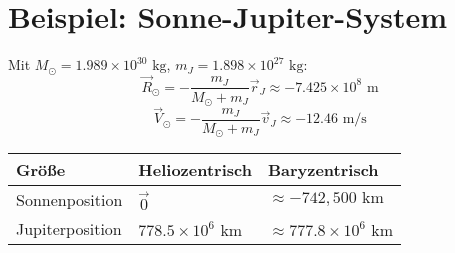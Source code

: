 \section{Beispiel: Sonne-Jupiter-System}
Mit $M_\odot = 1.989 \times 10^{30} \text{ kg}$, $m_J = 1.898 \times 10^{27} \text{ kg}$:
\[
\vec{R}_\odot = -\frac{m_J}{M_\odot + m_J} \vec{r}_J \approx -7.425 \times 10^8 \text{ m}
\]
\[
\vec{V}_\odot = -\frac{m_J}{M_\odot + m_J} \vec{v}_J \approx -12.46 \text{ m/s}
\]

\begin{table}[h]
\centering
\begin{tabular}{|l|l|l|}
\hline
\textbf{Größe} & \textbf{Heliozentrisch} & \textbf{Baryzentrisch} \\ \hline
Sonnenposition & $\vec{0}$ & $\approx -742,500 \text{ km}$ \\ \hline
Jupiterposition & $778.5 \times 10^6 \text{ km}$ & $\approx 777.8 \times 10^6 \text{ km}$ \\ \hline
\end{tabular}
\end{table}